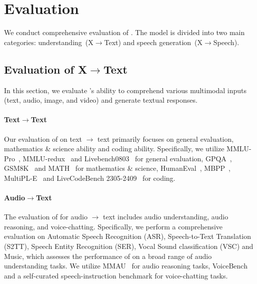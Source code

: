 



\section{Evaluation}
\label{sec:experiment}
We conduct comprehensive evaluation of \method. The model is divided into two main categories: understanding~(X$\to$Text) and speech generation~(X$\to$Speech). 

\subsection{Evaluation of X$\to$Text}
In this section, we evaluate \method's ability to comprehend various multimodal inputs (text, audio, image, and video) and generate textual responses.

\paragraph{Text$\to$Text} Our evaluation of \method on text $\to$ text primarily focuses on general evaluation, mathematics \& science ability and coding ability. Specifically, we utilize MMLU-Pro~\citep{mmlupro}, MMLU-redux~\citep{mmluredux} and Livebench0803~\citep{livebench} for general evaluation, GPQA~\citep{gpqa}, GSM8K~\citep{gsm8k} and MATH~\citep{math} for mathematics \& science, HumanEval~\citep{humaneval}, MBPP~\citep{mbpp}, MultiPL-E~\citep{multiple} and LiveCodeBench 2305-2409~\citep{livecodebench} for coding.

\paragraph{Audio$\to$Text} The evaluation of \method for audio $\to$ text includes audio understanding, audio reasoning, and voice-chatting. Specifically, we perform a comprehensive evaluation on Automatic Speech Recognition (ASR), Speech-to-Text Translation (S2TT), Speech Entity Recognition (SER), Vocal Sound classification (VSC) and Music, which assesses the performance of \method on a broad range of audio understanding tasks. We utilize MMAU~\citep{sakshi2024mmaumassivemultitaskaudio} for audio reasoning tasks, VoiceBench~\citep{chen2024voicebench} and a self-curated speech-instruction benchmark for voice-chatting tasks.

